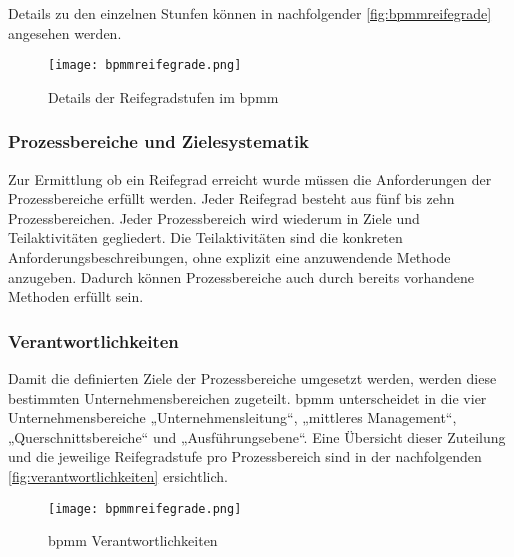 Details zu den einzelnen Stunfen können in nachfolgender \autoref{fig:bpmmreifegrade} angesehen werden.

\begin{figure}[H]
  \centering
  \caption{Details der Reifegradstufen im \acs{bpmm}}
  \texttt{[image: bpmmreifegrade.png]}
  \label{fig:bpmmreifegrade}
\end{figure}

\subsubsection{Prozessbereiche und Zielesystematik}

Zur Ermittlung ob ein Reifegrad erreicht wurde müssen die Anforderungen der Prozessbereiche erfüllt werden. Jeder Reifegrad besteht aus fünf bis zehn Prozessbereichen. Jeder Prozessbereich wird wiederum in Ziele und Teilaktivitäten gegliedert. Die Teilaktivitäten sind die konkreten Anforderungsbeschreibungen, ohne explizit eine anzuwendende Methode anzugeben. Dadurch können Prozessbereiche auch durch bereits vorhandene Methoden erfüllt sein.

\subsubsection{Verantwortlichkeiten}

Damit die definierten Ziele der Prozessbereiche umgesetzt werden, werden diese bestimmten Unternehmensbereichen zugeteilt. \acs{bpmm} unterscheidet in die vier Unternehmensbereiche „Unternehmensleitung“, „mittleres Management“, „Querschnittsbereiche“ und „Ausführungsebene“. Eine Übersicht dieser Zuteilung und die jeweilige Reifegradstufe pro Prozessbereich sind in der nachfolgenden \autoref{fig:verantwortlichkeiten} ersichtlich.

\begin{figure}[H]
  \centering
  \caption{\acs{bpmm} Verantwortlichkeiten}
  \texttt{[image: bpmmreifegrade.png]}
  \label{fig:verantwortlichkeiten}
\end{figure}

